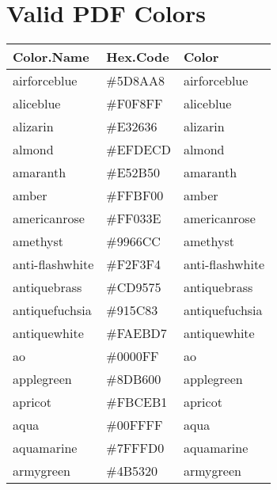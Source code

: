 \documentclass[
]{article}
\begin{document}
\hypertarget{valid-pdf-colors}{%
\section{Valid PDF Colors}\label{valid-pdf-colors}}

\begin{longtable}[]{@{}lll@{}}
\toprule
Color.Name & Hex.Code & Color\tabularnewline
\midrule
\endhead
airforceblue & \colorbox[rgb]{0.36,0.54,0.66}{\#5D8AA8} &
\textcolor[rgb]{0.36,0.54,0.66}{airforceblue          }\tabularnewline
aliceblue & \colorbox[rgb]{0.94,0.97,1.0}{\#F0F8FF} &
\textcolor[rgb]{0.94,0.97,1.0}{aliceblue             }\tabularnewline
alizarin & \colorbox[rgb]{0.82,0.1,0.26}{\#E32636} &
\textcolor[rgb]{0.82,0.1,0.26}{alizarin              }\tabularnewline
almond & \colorbox[rgb]{0.94,0.87,0.8}{\#EFDECD} &
\textcolor[rgb]{0.94,0.87,0.8}{almond                }\tabularnewline
amaranth & \colorbox[rgb]{0.9,0.17,0.31}{\#E52B50} &
\textcolor[rgb]{0.9,0.17,0.31}{amaranth              }\tabularnewline
amber & \colorbox[rgb]{1.0,0.75,0.0}{\#FFBF00} &
\textcolor[rgb]{1.0,0.75,0.0}{amber                 }\tabularnewline
americanrose & \colorbox[rgb]{1.0,0.01,0.24}{\#FF033E} &
\textcolor[rgb]{1.0,0.01,0.24}{americanrose          }\tabularnewline
amethyst & \colorbox[rgb]{0.6,0.4,0.8}{\#9966CC} &
\textcolor[rgb]{0.6,0.4,0.8}{amethyst              }\tabularnewline
anti-flashwhite & \colorbox[rgb]{0.95,0.95,0.96}{\#F2F3F4} &
\textcolor[rgb]{0.95,0.95,0.96}{anti-flashwhite       }\tabularnewline
antiquebrass & \colorbox[rgb]{0.8,0.58,0.46}{\#CD9575} &
\textcolor[rgb]{0.8,0.58,0.46}{antiquebrass          }\tabularnewline
antiquefuchsia & \colorbox[rgb]{0.57,0.36,0.51}{\#915C83} &
\textcolor[rgb]{0.57,0.36,0.51}{antiquefuchsia        }\tabularnewline
antiquewhite & \colorbox[rgb]{0.98,0.92,0.84}{\#FAEBD7} &
\textcolor[rgb]{0.98,0.92,0.84}{antiquewhite          }\tabularnewline
ao & \colorbox[rgb]{0.0,0.0,1.0}{\#0000FF} &
\textcolor[rgb]{0.0,0.0,1.0}{ao                    }\tabularnewline
applegreen & \colorbox[rgb]{0.55,0.71,0.0}{\#8DB600} &
\textcolor[rgb]{0.55,0.71,0.0}{applegreen            }\tabularnewline
apricot & \colorbox[rgb]{0.98,0.81,0.69}{\#FBCEB1} &
\textcolor[rgb]{0.98,0.81,0.69}{apricot               }\tabularnewline
aqua & \colorbox[rgb]{0.0,1.0,1.0}{\#00FFFF} &
\textcolor[rgb]{0.0,1.0,1.0}{aqua                  }\tabularnewline
aquamarine & \colorbox[rgb]{0.5,1.0,0.83}{\#7FFFD0} &
\textcolor[rgb]{0.5,1.0,0.83}{aquamarine            }\tabularnewline
armygreen & \colorbox[rgb]{0.29,0.33,0.13}{\#4B5320} &
\textcolor[rgb]{0.29,0.33,0.13}{armygreen             }\tabularnewline

\end{longtable}
\end{document}
